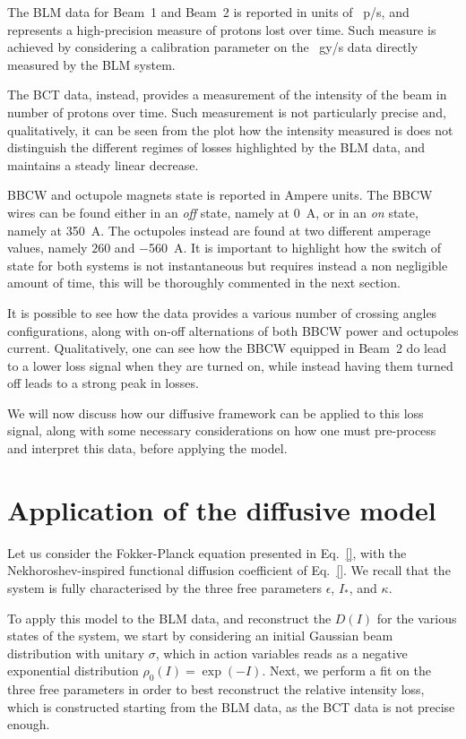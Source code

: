 The BLM data for Beam~1 and Beam~2 is reported in units of \SI{}{p/s}, and represents a high-precision measure of protons lost over time. Such measure is achieved by considering a calibration parameter on the \SI{}{gy/s} data directly measured by the BLM system.

The BCT data, instead, provides a measurement of the intensity of the beam in number of protons over time. Such measurement is not particularly precise and, qualitatively, it can be seen from the plot how the intensity measured is does not distinguish the different regimes of losses highlighted by the BLM data, and maintains a steady linear decrease.

BBCW and octupole magnets state is reported in Ampere units. The BBCW wires can be found either in an \textit{off} state, namely at \SI{0}{\ampere}, or in an \textit{on} state, namely at \SI{350}{\ampere}. The octupoles instead are found at two different amperage values, namely $260$ and \SI{-560}{\ampere}. It is important to highlight how the switch of state for both systems is not instantaneous but requires instead a non negligible amount of time, this will be thoroughly commented in the next section.

It is possible to see how the data provides a various number of crossing angles configurations, along with on-off alternations of both BBCW power and octupoles current. Qualitatively, one can see how the BBCW equipped in Beam~2 do lead to a lower loss signal when they are turned on, while instead having them turned off leads to a strong peak in losses.

We will now discuss how our diffusive framework can be applied to this loss signal, along with some necessary considerations on how one must pre-process and interpret this data, before applying the model. 

\section{Application of the diffusive model}

Let us consider the Fokker-Planck equation presented in Eq.~\eqref{}, with the Nekhoroshev-inspired functional diffusion coefficient of Eq.~\eqref{}. We recall that the system is fully characterised by the three free parameters $\epsilon$, $I_\ast$, and $\kappa$.

To apply this model to the BLM data, and reconstruct the $D(I)$ for the various states of the system, we start by considering an initial Gaussian beam distribution with unitary $\sigma$, which in action variables reads as a negative exponential distribution $\rho_0(I) = \exp(-I)$. Next, we perform a fit on the three free parameters in order to best reconstruct the relative intensity loss, which is constructed starting from the BLM data, as the BCT data is not precise enough.

